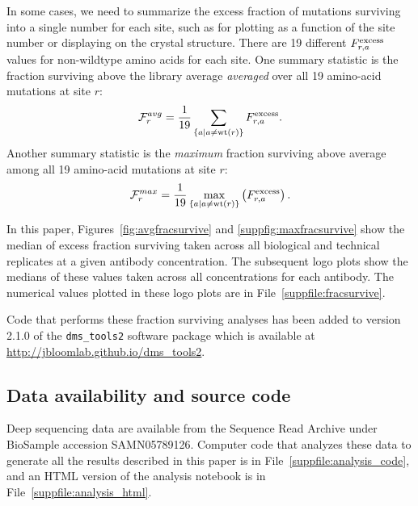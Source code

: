 \documentclass[11pt]{article}
\begin{document}
In some cases, we need to summarize the excess fraction of mutations surviving into a single number for each site, such as for plotting as a function of the site number or displaying on the crystal structure.
There are 19 different $F_{r,a}^{\rm{excess}}$ values for non-wildtype amino acids for each site. 
One summary statistic is the fraction surviving above the library average \emph{averaged} over all 19 amino-acid mutations at site $r$:
\begin{equation}
\label{eq:avgfracsurvive}
\mathcal{F}_r^{avg} = \frac{1}{19} \sum\limits_{\left\{a \mid a \ne \operatorname{wt}\left(r\right)\right\}} F_{r,a}^{\rm{excess}}.
\end{equation}
Another summary statistic is the \emph{maximum} fraction surviving above average among all 19 amino-acid mutations at site $r$:
\begin{equation}
\label{eq:maxfracsurvive}
\mathcal{F}_r^{max} = \frac{1}{19} \max\limits_{\left\{a \mid a \ne \operatorname{wt}\left(r\right)\right\}}\left( F_{r,a}^{\rm{excess}} \right).
\end{equation}

In this paper, Figures~\ref{fig:avgfracsurvive} and \ref{suppfig:maxfracsurvive} show the median of excess fraction surviving taken across all biological and technical replicates at a given antibody concentration.
The subsequent logo plots show the medians of these values taken across all concentrations for each antibody.
The numerical values plotted in these logo plots are in File~\ref{suppfile:fracsurvive}.

Code that performs these fraction surviving analyses has been added to version 2.1.0 of the \texttt{dms\_tools2} software package\cite{bloom2015software} which is available at \url{http://jbloomlab.github.io/dms_tools2}.

\subsection*{Data availability and source code}
Deep sequencing data are available from the Sequence Read Archive under BioSample accession SAMN05789126.
Computer code that analyzes these data to generate all the results described in this paper is in File~\ref{suppfile:analysis_code}, and an HTML version of the analysis notebook is in File~\ref{suppfile:analysis_html}.
\end{document}

